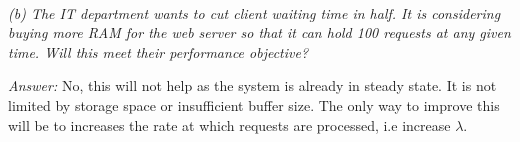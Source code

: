 \documentclass[12pt]{article}
\newenvironment{QandA}{\begin{enumerate}[label=\bfseries\arabic*.]\bfseries}
                      {\end{enumerate}}
\newenvironment{answered}{\par\quad\normalfont}{}
\begin{document}
\begin{QandA}
\begin{answered}
    \ 
    
    \textit{(b) The IT department wants to cut client waiting time in half. It is considering buying more RAM for the web server so that it can hold 100 requests at any given time. Will this meet their performance objective?}
    
    \textit{Answer:} No, this will not help as the system is already in steady state. It is not limited by storage space or insufficient buffer size. The only way to improve this will be to increases the rate at which requests are processed, i.e increase $\lambda$.
    
    
    \end{answered}
    
    
\end{QandA}
\end{document}
